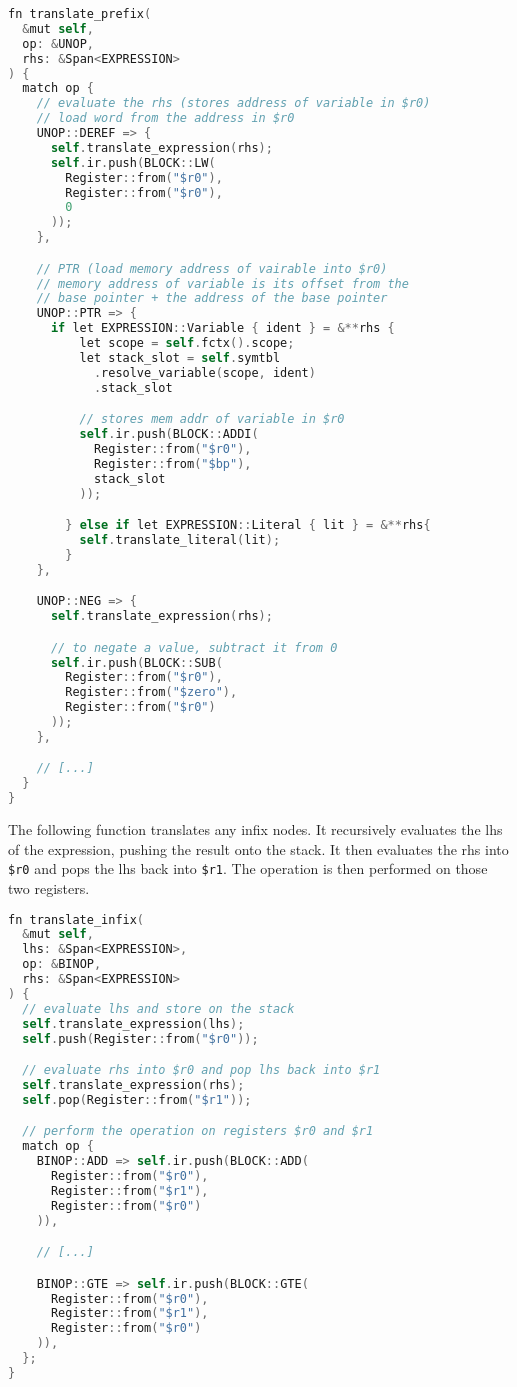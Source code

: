 \begin{lstlisting}[language=C]
fn translate_prefix(
  &mut self, 
  op: &UNOP, 
  rhs: &Span<EXPRESSION>
) {
  match op {
    // evaluate the rhs (stores address of variable in $r0)
    // load word from the address in $r0
    UNOP::DEREF => {
      self.translate_expression(rhs);
      self.ir.push(BLOCK::LW(
        Register::from("$r0"), 
        Register::from("$r0"), 
        0
      ));
    },

    // PTR (load memory address of vairable into $r0)
    // memory address of variable is its offset from the 
    // base pointer + the address of the base pointer
    UNOP::PTR => {
      if let EXPRESSION::Variable { ident } = &**rhs {
          let scope = self.fctx().scope;
          let stack_slot = self.symtbl
            .resolve_variable(scope, ident)
            .stack_slot

          // stores mem addr of variable in $r0
          self.ir.push(BLOCK::ADDI(
            Register::from("$r0"), 
            Register::from("$bp"), 
            stack_slot
          ));

        } else if let EXPRESSION::Literal { lit } = &**rhs{
          self.translate_literal(lit);
        }
    },

    UNOP::NEG => {
      self.translate_expression(rhs);

      // to negate a value, subtract it from 0
      self.ir.push(BLOCK::SUB(
        Register::from("$r0"), 
        Register::from("$zero"),
        Register::from("$r0")
      ));
    },

    // [...]
  }
}
\end{lstlisting}

The following function translates any infix nodes. It recursively evaluates the lhs of the expression, pushing the result onto the stack. It then evaluates the rhs into \texttt{\$r0} and pops the lhs back into \texttt{\$r1}. The operation is then performed on those two registers. 

\begin{lstlisting}[language=C]
fn translate_infix(
  &mut self, 
  lhs: &Span<EXPRESSION>, 
  op: &BINOP, 
  rhs: &Span<EXPRESSION>
) {
  // evaluate lhs and store on the stack
  self.translate_expression(lhs);
  self.push(Register::from("$r0"));

  // evaluate rhs into $r0 and pop lhs back into $r1
  self.translate_expression(rhs);
  self.pop(Register::from("$r1"));

  // perform the operation on registers $r0 and $r1
  match op {
    BINOP::ADD => self.ir.push(BLOCK::ADD(
      Register::from("$r0"), 
      Register::from("$r1"), 
      Register::from("$r0")
    )),

    // [...] 

    BINOP::GTE => self.ir.push(BLOCK::GTE(
      Register::from("$r0"), 
      Register::from("$r1"), 
      Register::from("$r0")
    )),
  };
}
\end{lstlisting}

